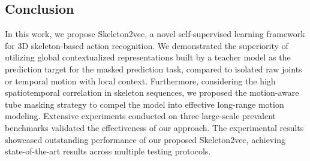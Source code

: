 \subsection{Conclusion}
In this work, we propose Skeleton2vec, a novel self-supervised learning framework
for 3D skeleton-based action recognition. We demonstrated the superiority of utilizing
global contextualized representations built by a teacher model as the prediction target
for the masked prediction task, compared to isolated raw joints or temporal motion with
local context. Furthermore, considering the high spatiotemporal correlation in skeleton
sequences, we proposed the motion-aware tube masking strategy to compel the model into
effective long-range motion modeling. Extensive experiments conducted on three large-scale
prevalent benchmarks validated the effectiveness of our approach. The experimental results
showcased outstanding performance of our proposed Skeleton2vec,
achieving state-of-the-art results across multiple testing protocols.
